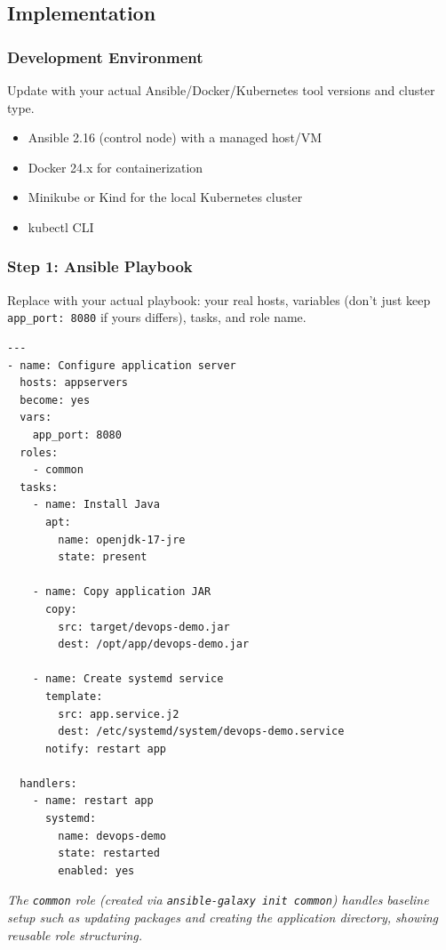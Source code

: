 \documentclass[12pt,a4paper]{article}
\begin{document}
\subsection*{Implementation}

\subsubsection*{Development Environment}
\begin{studentnote}
Update with your actual Ansible/Docker/Kubernetes tool versions and cluster type.
\end{studentnote}
\begin{itemize}[nosep]
    \item Ansible 2.16 (control node) with a managed host/VM
    \item Docker 24.x for containerization
    \item Minikube or Kind for the local Kubernetes cluster
    \item kubectl CLI
\end{itemize}

\subsubsection*{Step 1: Ansible Playbook}
\begin{studentnote}
Replace with your actual playbook: your real hosts, variables (don't just keep \texttt{app\_port: 8080} if yours differs), tasks, and role name.
\end{studentnote}
\begin{lstlisting}[language=bash]
---
- name: Configure application server
  hosts: appservers
  become: yes
  vars:
    app_port: 8080
  roles:
    - common
  tasks:
    - name: Install Java
      apt:
        name: openjdk-17-jre
        state: present

    - name: Copy application JAR
      copy:
        src: target/devops-demo.jar
        dest: /opt/app/devops-demo.jar

    - name: Create systemd service
      template:
        src: app.service.j2
        dest: /etc/systemd/system/devops-demo.service
      notify: restart app

  handlers:
    - name: restart app
      systemd:
        name: devops-demo
        state: restarted
        enabled: yes
\end{lstlisting}

\textit{The \texttt{common} role (created via \texttt{ansible-galaxy init common}) handles baseline setup such as updating packages and creating the application directory, showing reusable role structuring.}
\end{document}
